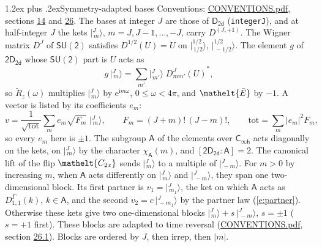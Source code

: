 \documentclass[10pt,a4paper]{article}
\makeatletter
\renewcommand\section{\@startsection{section}{1}{\z@}{-3ex plus -1ex minus -.2ex}%
  {1.2ex plus .2ex}{\normalfont\large\sffamily\bfseries\color{parttitle}}}
\numberwithin{equation}{section}
\newcommand{\eltfont}[1]{{\let\sigma\eltsigma\mathelt{#1}}}
\newcommand{\grp}[1]{\mathsf{#1}}
\newcommand{\elt}[1]{\eltfont{#1}}
\newcommand{\grpindex}[2]{[#1 : #2]}
\newcommand{\iunit}{\mathrm{i}}
\newcommand{\expe}{\mathrm{e}}
\newcommand{\irrJp}[2]{D^{(#1,#2)}}
\newcommand{\repD}[1]{D^{#1}}
\newcommand{\wignerD}[1]{D^{#1}}
\newcommand{\chiA}{\chi_{\grp{A}}}
\newcommand{\conj}[1]{{#1}^{*}}
\newcommand{\jm}[2]{\bigl\lvert{}^{#1}_{\,#2}\bigr\rangle}
\newcommand{\barred}[1]{\bar{#1}}
\newcommand{\lift}[1]{\tilde{#1}}
\makeatother
\begin{document}
\section{Symmetry-adapted bases}\label{s:bases}
Conventions: \href{../../CONVENTIONS.pdf}{CONVENTIONS.pdf}, sections \href{../../../rotation/CONVENTIONS.pdf\#conv.14}{14} and \href{../../CONVENTIONS.pdf\#conv.26}{26}.
\leavevmode\label{n:index.m}\label{n:vector.ket}The bases at integer $J$ are those of \href{../../../rotation/data/pdf/D2d.pdf}{$\grp{D_{2d}}$} (\texttt{integerJ}), and at half-integer $J$ the kets $\jm{J}{m}$, $m = J, J-1, \dots, -J$, carry $\irrJp{J}{+1}$. \label{n:matrix.wigner}The Wigner matrix $\wignerD{J}$ of $\grp{SU(2)}$ satisfies $\wignerD{1/2}(U) = U$ on $\jm{1/2}{1/2}$, $\jm{1/2}{-1/2}$. The element $g$ of $\grp{2D_{2d}}$ whose $\grp{SU(2)}$ part is $U$ acts as
\begin{equation}\label{e:action}g\,\jm{J}{m} = \sum_{m'} \jm{J}{m'}\; \conj{\wignerD{J}_{m m'}(U)},\end{equation}
so $\lift{R}_{z}(\omega)$ multiplies $\jm{J}{m}$ by $\expe^{\iunit m\omega}$, $0 \le \omega < 4\pi$, and $\elt{\barred{E}}$ by $-1$. \label{n:index.ketcoefficient}\label{n:vector.basis.symmetry}\label{n:index.ketweight}\label{n:index.total}A vector is listed by its coefficients $e_m$:
\begin{equation}\label{e:ket}v = \frac{1}{\sqrt{\mathrm{tot}}}\sum_m e_m\sqrt{F_m}\;\jm{J}{m},\qquad F_m = (J+m)!\,(J-m)!,\qquad \mathrm{tot} = \sum_m |e_m|^2F_m,\end{equation}
so every $e_m$ here is $\pm 1$.
\leavevmode\label{n:group.A}\label{n:function.character.abelian}The subgroup $\grp{A}$ of the elements over $\grp{C_{\infty h}}$ acts diagonally on the kets, on $\jm{J}{m}$ by the character $\chiA(m)$, and $\grpindex{\grp{2D_{2d}}}{\grp{A}} = 2$. The canonical lift of the flip $\elt{C_{2x}}$ sends $\jm{J}{m}$ to a multiple of $\jm{J}{-m}$. For $m > 0$ by increasing $m$, when $\grp{A}$ acts differently on $\jm{J}{m}$ and $\jm{J}{-m}$, they span one two-dimensional block. \label{n:index.partner.sign}Its first partner is $v_1 = \jm{J}{m_1}$, the ket on which $\grp{A}$ acts as $\repD{\Gamma}_{1,1}(k)$, $k \in \grp{A}$, and the second $v_2 = c\,\jm{J}{-m_1}$ by the partner law (\ref{e:partner}). \label{n:index.pair.sign}Otherwise these kets give two one-dimensional blocks $\jm{J}{m} + s\,\jm{J}{-m}$, $s = \pm 1$ ($s = +1$ first). These blocks are adapted to time reversal (\href{../../CONVENTIONS.pdf}{CONVENTIONS.pdf}, section \href{../../CONVENTIONS.pdf\#conv.26.1}{26.1}). Blocks are ordered by $J$, then irrep, then $|m|$.
\end{document}
